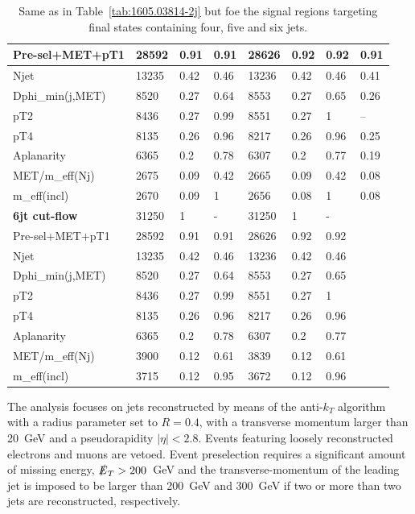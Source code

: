 \documentclass[11pt]{cernrep}
\begin{document}
\begin{table}
\begin{tabular}{ | l || l | l | l || l | l | l || l | }
Pre-sel+MET+pT1   & 28592 & 0.91 & 0.91 & 28626 & 0.92 & 0.92 & 0.91  \\ \hline
Njet              & 13235 & 0.42 & 0.46 & 13236 & 0.42 & 0.46 & 0.41  \\ \hline
Dphi\_min(j,MET)   & 8520 & 0.27 & 0.64 & 8553 & 0.27 & 0.65 & 0.26  \\ \hline
pT2               & 8436 & 0.27 & 0.99 & 8551 & 0.27 & 1 &    --        \\ \hline
pT4               & 8135 & 0.26 & 0.96 & 8217 & 0.26 & 0.96 & 0.25  \\ \hline
Aplanarity        & 6365 & 0.2 & 0.78 & 6307 & 0.2 & 0.77 & 0.19  \\ \hline
MET/m\_eff(Nj)     & 2675 & 0.09 & 0.42 & 2665 & 0.09 & 0.42 & 0.08  \\ \hline
m\_eff(incl)       & 2670 & 0.09 & 1 & 2656 & 0.08 & 1 & 0.08  \\ \hline
\hline
{\bf 6jt cut-flow} & 31250 & 1 & - & 31250 & 1 & - & \   \\ \hline
Pre-sel+MET+pT1   & 28592 & 0.91 & 0.91 & 28626 & 0.92 & 0.92 & \   \\ \hline
Njet              & 13235 & 0.42 & 0.46 & 13236 & 0.42 & 0.46 & \   \\ \hline
Dphi\_min(j,MET)   & 8520 & 0.27 & 0.64 & 8553 & 0.27 & 0.65 & \   \\ \hline
pT2               & 8436 & 0.27 & 0.99 & 8551 & 0.27 & 1 & \   \\ \hline
pT4               & 8135 & 0.26 & 0.96 & 8217 & 0.26 & 0.96 & \   \\ \hline
Aplanarity        & 6365 & 0.2 & 0.78 & 6307 & 0.2 & 0.77 & \   \\ \hline
MET/m\_eff(Nj)     & 3900 & 0.12 & 0.61 & 3839 & 0.12 & 0.61 & \   \\ \hline
m\_eff(incl)       & 3715 & 0.12 & 0.95 & 3672 & 0.12 & 0.96 & \   \\ \hline
 \end{tabular}
 \caption{Same as in Table~\ref{tab:1605.03814-2j} but foe the signal regions
  targeting final states containing four, five and six jets.}
	\label{tab:1605.03814-nj}
\end{table}

The analysis focuses on jets reconstructed by means of the anti-$k_T$
algorithm~\cite{Cacciari:2008gp} with a radius parameter set to $R=0.4$, with
a transverse momentum larger than 20~GeV and a pseudorapidity $|\eta|<2.8$.
Events featuring loosely reconstructed electrons and muons are vetoed.
Event preselection requires a significant amount of missing energy,
$\slashed{E}_T > 200$~GeV and the transverse-momentum of the leading jet is
imposed to be larger than 200~GeV and 300~GeV if two or more than two jets are
reconstructed, respectively.
\end{document}
